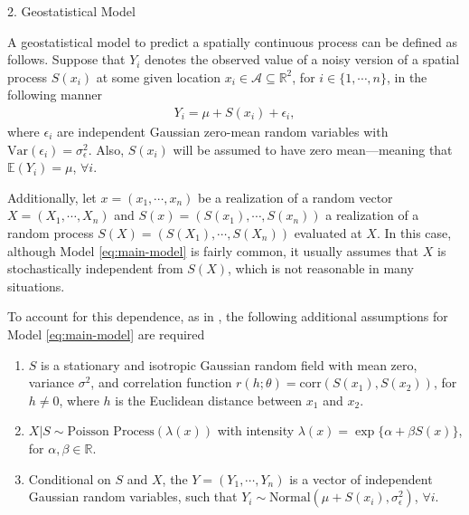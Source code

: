 \documentclass[12pt]{beamer}
\begin{document}
\begin{frame}[t]
\begin{columns}[t]
\begin{column}{0.30\textwidth}
\begin{block}{\Large 2. Geostatistical Model}
				
				A geostatistical model to predict a spatially continuous process can be defined as follows. 
				Suppose that $Y_i$ denotes the observed value of a noisy version of a spatial process $S(x_i)$ at some given location $x_i \in \mathcal{A} \subseteq \mathbb{R}^2$, for $i \in \{1, \cdots, n\}$, in the following manner
				\begin{align} \label{eq:main-model}
					Y_i = \mu + S(x_i) + \epsilon_i,
				\end{align}
				where $\epsilon_i$ are independent Gaussian zero-mean random variables with $\text{Var}(\epsilon_i) = \sigma^2_{\epsilon}$. Also, $S(x_i)$ will be assumed to have zero mean---meaning that $\mathbb{E}(Y_i) = \mu$, $\forall i$.\vspace{18pt}
				
				Additionally, let $x = (x_1, \cdots, x_n)$ be a realization of a random vector  $X = (X_1, \cdots, X_n)$ and $S(x) = (S(x_1), \cdots, S(x_n))$ a realization of a random process $S(X) = (S(X_1), \cdots, S(X_n))$ evaluated at $X$. In this case, although Model \eqref{eq:main-model} is fairly common, it usually assumes that $X$ is stochastically independent from $S(X)$, which is not reasonable in many situations.\vspace{18pt}
				
				To account for this dependence, as in \cite{diggle2010geostatistical}, the following additional assumptions for Model \eqref{eq:main-model} are required\vspace{18pt}
				\begin{enumerate} \justifying
					\item $S$ is a stationary and isotropic Gaussian random field with mean zero, variance $\sigma^2$, and correlation function $r(h; \theta) = \text{corr}(S(x_1), S(x_2))$, for $h \neq 0$, where $h$ is the Euclidean distance between $x_1$ and $x_2$.
					\item $X|S \sim \text{Poisson Process}(\lambda(x))$ with intensity $\lambda(x) = \exp\{\alpha + \beta S(x)\}$, for $\alpha, \beta \in \mathbb{R}$.
					\item Conditional on $S$ and $X$, the $Y = (Y_1, \cdots, Y_n)$ is a vector of independent Gaussian random variables, such that $Y_i \sim \text{Normal}(\mu + S(x_i), \sigma^2_{\epsilon})$, $\forall i$.
				\end{enumerate}\vspace{18pt}
				
			\end{block}
				

\end{column}
\end{columns}
\end{frame}
\end{document}
